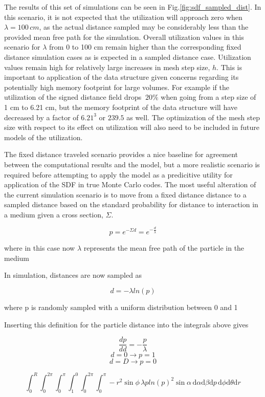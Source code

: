 The results of this set of simulations can be seen in
Fig.\ref{fig:sdf_sampled_dist}. In this scenario, it is not expected that the
utilization will approach zero when $\lambda = 100\, cm$, as the actual distance
sampled may be considerably less than the provided mean free path for the
simulation. Overall utilization values in this scenario for $\lambda$ from 0 to
100 cm remain higher than the corresponding fixed distance simulation cases as
is expected in a sampled distance case. Utilization values remain high for
relatively large increases in mesh step size, $h$. This is important to
application of the data structure given concerns regarding its potentially high
memory footprint for large volumes. For example if the utilization of the signed
distance field drops $~20\%$ when going from a step size of 1 cm to 6.21 cm, but
the memory footprint of the data structure will have decreased by a factor of
$6.21^3$ or $239.5$ as well. The optimization of the mesh step size with respect
to its effect on utilization will also need to be included in future models of
the utilization.

The fixed distance traveled scenario provides a nice baseline for agreement
between the computational results and the model, but a more realistic scenario
is required before attempting to apply the model as a predicitive utility for
application of the SDF in true Monte Carlo codes. The most useful alteration of
the current simulation scenario is to move from a fixed distance distance to a
sampled distance based on the standard probability for distance to interaction
in a medium given a cross section, $\Sigma$.

$$ p = e^{-\Sigma d} = e^{-\frac{d}{\lambda}} $$

where in this case now $\lambda$ represents the mean free path of the particle in the medium

In simulation, distances are now sampled as

$$ d = -\lambda ln(p) $$

where p is randomly sampled with a uniform distribution between 0 and 1

Inserting this definition for the particle distance into the integrals above
gives

$$ \frac{dp}{dd} = -\frac{p}{\lambda} $$
$$ d = 0 \rightarrow p = 1 $$
$$ d = D \rightarrow p = 0 $$

$$ \int_{0}^{R}\int_{0}^{2\pi}\int_{0}^{\pi}\int_{1}^{0}\int_{0}^{2\pi}\int_{0}^{\pi}
-r^2\sin{\phi} \, \lambda p ln(p)^2 \sin{\alpha} \, \mathrm{d}\alpha \mathrm{d}\beta \mathrm{d}p \, \mathrm{d}\phi
\mathrm{d}\theta \mathrm{d}r $$

